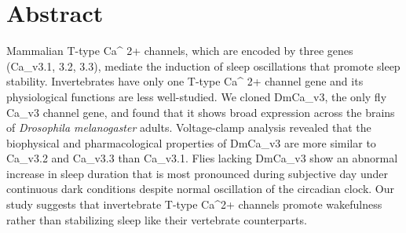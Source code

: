 \section*{Abstract}
Mammalian T-type Ca^ {2+} channels, which are encoded by three genes (Ca_{v}3.1, 3.2, 3.3), mediate the induction of sleep oscillations that promote sleep stability.
Invertebrates have only one T-type Ca^ {2+} channel gene and its physiological functions are less well-studied.
We cloned DmCa_{v}3, the only fly Ca_{v}3 channel gene, and found that it shows broad expression across the brains of \emph{Drosophila melanogaster} adults.
Voltage-clamp analysis revealed that the biophysical and pharmacological properties of DmCa_{v}3 are more similar to Ca_{v}3.2 and Ca_{v}3.3 than Ca_{v}3.1.
Flies lacking DmCa_{v}3 show an abnormal increase in sleep duration that is most pronounced during subjective day under continuous dark conditions despite normal oscillation of the circadian clock.
Our study suggests that invertebrate T-type Ca^{2+} channels promote wakefulness rather than stabilizing sleep like their vertebrate counterparts.
    